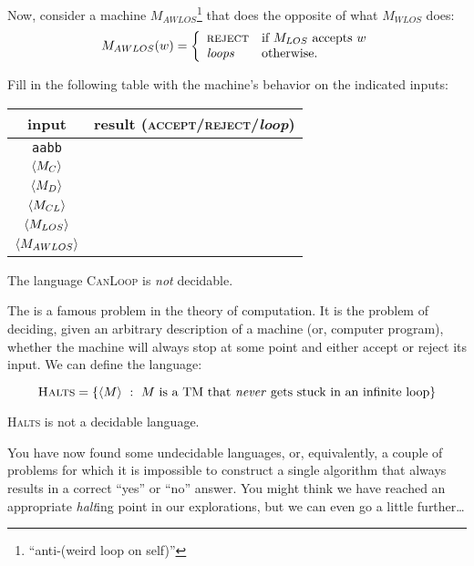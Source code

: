 \documentclass[twoside,letterpaper,openany]{book}
\begin{document}
\begin{exer}
Now, consider a machine $M_{AWLOS}$\footnote{``anti-(weird loop on self)''} that does the opposite of what $M_{WLOS}$ does:
\[ M_{AWLOS}(w) = \bigg\{
\begin{array}{ll}
\textsc{reject} &  \textrm{if $M_{LOS}$ accepts $w$} \\
\textit{loops} & \textrm{otherwise.}
\end{array}
\]

Fill in the following table with the machine's behavior on the indicated inputs:
\begin{center}
\renewcommand{\arraystretch}{1.25}
\begin{tabular}[c]{c|c}
input & result (\textsc{accept}/\textsc{reject}/\textit{loop}) \\\hline
\texttt{aabb} & \\
${\langle{M_{C}}\rangle}$ & \\
${\langle{M_{D}}\rangle}$ & \\
${\langle{M_{CL}}\rangle}$ & \\
${\langle{M_{LOS}}\rangle}$ & \\
${\langle{M_{AWLOS}}\rangle}$ & \\
\end{tabular}
\end{center}
\end{exer}

\begin{stmt}
The language \textsc{CanLoop} is \emph{not} decidable.
\end{stmt}

\begin{discussion}
The  is a famous problem in the theory of computation. It is the problem of deciding, given an arbitrary description of a machine (or, computer program), whether the machine will always stop at some point and either accept or reject its input. We can define the language:

\[ \textsc{Halts} = \left\lbrace {\langle{M}\rangle}\ :\ M~\textrm{is a TM that \emph{never} gets stuck in an infinite loop} \right\rbrace \]
\end{discussion}

\begin{stmt}
\textsc{Halts} is not a decidable language.
\end{stmt}

\begin{discussion}
You have now found some undecidable languages, or, equivalently, a couple of problems for which it is impossible to construct a single algorithm that always results in a correct ``yes'' or ``no'' answer. 
You might think we have reached an appropriate \emph{halt}ing point in our explorations, but we can even go a little further\ldots
\end{discussion}
\end{document}

